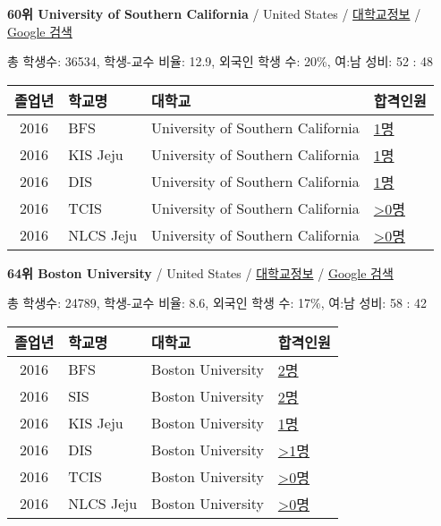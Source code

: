 \documentclass[13pt,]{article}
\begin{document}
\textbf{60위 University of Southern California} / United States /
\href{https://www.timeshighereducation.com/world-university-rankings/university-of-southern-california?ranking-dataset=589595}{대학교정보}
/
\href{http://www.google.com/search?q=University+of+Southern+California}{Google
검색}

총 학생수: 36534, 학생-교수 비율: 12.9, 외국인 학생 수: 20\%, 여:남
성비: 52 : 48

\begin{longtable}[]{@{}clll@{}}
\toprule
졸업년 & 학교명 & 대학교 & 합격인원\tabularnewline
\midrule
\endhead
2016 & BFS & University of Southern California &
\href{http://cafe.naver.com/assarabia/11597}{1명}\tabularnewline
2016 & KIS Jeju & University of Southern California &
\href{http://cafe.naver.com/assarabia/11596}{1명}\tabularnewline
2016 & DIS & University of Southern California &
\href{http://cafe.naver.com/assarabia/11591}{1명}\tabularnewline
2016 & TCIS & University of Southern California &
\href{http://cafe.naver.com/assarabia/11598}{\textgreater{}0명}\tabularnewline
2016 & NLCS Jeju & University of Southern California &
\href{http://cafe.naver.com/assarabia/11592}{\textgreater{}0명}\tabularnewline
\bottomrule
\end{longtable}

\textbf{64위 Boston University} / United States /
\href{https://www.timeshighereducation.com/world-university-rankings/boston-university?ranking-dataset=589595}{대학교정보}
/ \href{http://www.google.com/search?q=Boston+University}{Google 검색}

총 학생수: 24789, 학생-교수 비율: 8.6, 외국인 학생 수: 17\%, 여:남 성비:
58 : 42

\begin{longtable}[]{@{}clll@{}}
\toprule
졸업년 & 학교명 & 대학교 & 합격인원\tabularnewline
\midrule
\endhead
2016 & BFS & Boston University &
\href{http://cafe.naver.com/assarabia/11597}{2명}\tabularnewline
2016 & SIS & Boston University &
\href{http://cafe.naver.com/assarabia/11589}{2명}\tabularnewline
2016 & KIS Jeju & Boston University &
\href{http://cafe.naver.com/assarabia/11596}{1명}\tabularnewline
2016 & DIS & Boston University &
\href{http://cafe.naver.com/assarabia/11591}{\textgreater{}1명}\tabularnewline
2016 & TCIS & Boston University &
\href{http://cafe.naver.com/assarabia/11598}{\textgreater{}0명}\tabularnewline
2016 & NLCS Jeju & Boston University &
\href{http://cafe.naver.com/assarabia/11592}{\textgreater{}0명}\tabularnewline
\bottomrule
\end{longtable}
\end{document}
